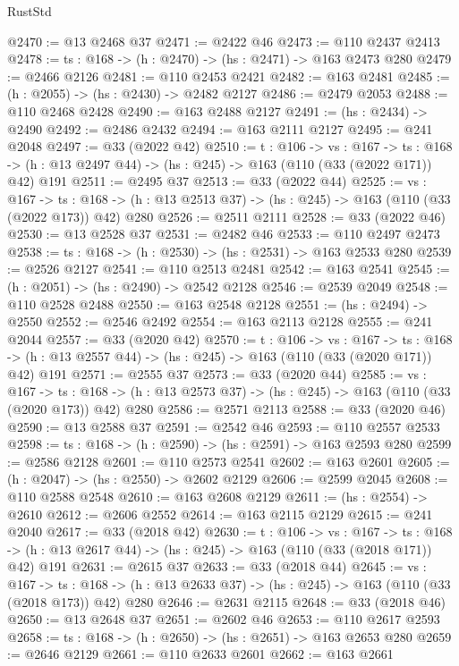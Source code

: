 \begin{lexlean}{RustStd}
\begin{coremodule}
@2470 := @13 @2468 @37
@2471 := @2422 @46
@2473 := @110 @2437 @2413
@2478 := {ts : @168} -> (h : @2470) -> (hs : @2471) -> @163 @2473 @280
@2479 := @2466 @2126
@2481 := @110 @2453 @2421
@2482 := @163 @2481
@2485 := (h : @2055) -> (hs : @2430) -> @2482 @2127
@2486 := @2479 @2053
@2488 := @110 @2468 @2428
@2490 := @163 @2488 @2127
@2491 := (hs : @2434) -> @2490
@2492 := @2486 @2432
@2494 := @163 @2111 @2127
@2495 := @241 @2048
@2497 := @33 (@2022 @42)
@2510 := {t : @106} ->
  {vs : @167} ->
  {ts : @168} -> (h : @13 @2497 @44) -> (hs : @245) -> @163 (@110 (@33 (@2022 @171)) @42) @191
@2511 := @2495 @37
@2513 := @33 (@2022 @44)
@2525 := {vs : @167} ->
  {ts : @168} -> (h : @13 @2513 @37) -> (hs : @245) -> @163 (@110 (@33 (@2022 @173)) @42) @280
@2526 := @2511 @2111
@2528 := @33 (@2022 @46)
@2530 := @13 @2528 @37
@2531 := @2482 @46
@2533 := @110 @2497 @2473
@2538 := {ts : @168} -> (h : @2530) -> (hs : @2531) -> @163 @2533 @280
@2539 := @2526 @2127
@2541 := @110 @2513 @2481
@2542 := @163 @2541
@2545 := (h : @2051) -> (hs : @2490) -> @2542 @2128
@2546 := @2539 @2049
@2548 := @110 @2528 @2488
@2550 := @163 @2548 @2128
@2551 := (hs : @2494) -> @2550
@2552 := @2546 @2492
@2554 := @163 @2113 @2128
@2555 := @241 @2044
@2557 := @33 (@2020 @42)
@2570 := {t : @106} ->
  {vs : @167} ->
  {ts : @168} -> (h : @13 @2557 @44) -> (hs : @245) -> @163 (@110 (@33 (@2020 @171)) @42) @191
@2571 := @2555 @37
@2573 := @33 (@2020 @44)
@2585 := {vs : @167} ->
  {ts : @168} -> (h : @13 @2573 @37) -> (hs : @245) -> @163 (@110 (@33 (@2020 @173)) @42) @280
@2586 := @2571 @2113
@2588 := @33 (@2020 @46)
@2590 := @13 @2588 @37
@2591 := @2542 @46
@2593 := @110 @2557 @2533
@2598 := {ts : @168} -> (h : @2590) -> (hs : @2591) -> @163 @2593 @280
@2599 := @2586 @2128
@2601 := @110 @2573 @2541
@2602 := @163 @2601
@2605 := (h : @2047) -> (hs : @2550) -> @2602 @2129
@2606 := @2599 @2045
@2608 := @110 @2588 @2548
@2610 := @163 @2608 @2129
@2611 := (hs : @2554) -> @2610
@2612 := @2606 @2552
@2614 := @163 @2115 @2129
@2615 := @241 @2040
@2617 := @33 (@2018 @42)
@2630 := {t : @106} ->
  {vs : @167} ->
  {ts : @168} -> (h : @13 @2617 @44) -> (hs : @245) -> @163 (@110 (@33 (@2018 @171)) @42) @191
@2631 := @2615 @37
@2633 := @33 (@2018 @44)
@2645 := {vs : @167} ->
  {ts : @168} -> (h : @13 @2633 @37) -> (hs : @245) -> @163 (@110 (@33 (@2018 @173)) @42) @280
@2646 := @2631 @2115
@2648 := @33 (@2018 @46)
@2650 := @13 @2648 @37
@2651 := @2602 @46
@2653 := @110 @2617 @2593
@2658 := {ts : @168} -> (h : @2650) -> (hs : @2651) -> @163 @2653 @280
@2659 := @2646 @2129
@2661 := @110 @2633 @2601
@2662 := @163 @2661

\end{coremodule}
\end{lexlean}
